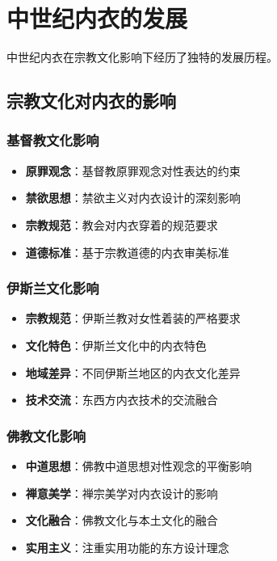 \documentclass[12pt,UTF8]{ctexbook}
\begin{document}
\section{中世纪内衣的发展}
中世纪内衣在宗教文化影响下经历了独特的发展历程。

\subsection{宗教文化对内衣的影响}
\subsubsection{基督教文化影响}
\begin{itemize}[leftmargin=2cm]
	\item \textbf{原罪观念}：基督教原罪观念对性表达的约束
	\item \textbf{禁欲思想}：禁欲主义对内衣设计的深刻影响
	\item \textbf{宗教规范}：教会对内衣穿着的规范要求
	\item \textbf{道德标准}：基于宗教道德的内衣审美标准
\end{itemize}

\subsubsection{伊斯兰文化影响}
\begin{itemize}[leftmargin=2cm]
	\item \textbf{宗教规范}：伊斯兰教对女性着装的严格要求
	\item \textbf{文化特色}：伊斯兰文化中的内衣特色
	\item \textbf{地域差异}：不同伊斯兰地区的内衣文化差异
	\item \textbf{技术交流}：东西方内衣技术的交流融合
\end{itemize}

\subsubsection{佛教文化影响}
\begin{itemize}[leftmargin=2cm]
	\item \textbf{中道思想}：佛教中道思想对性观念的平衡影响
	\item \textbf{禅意美学}：禅宗美学对内衣设计的影响
	\item \textbf{文化融合}：佛教文化与本土文化的融合
	\item \textbf{实用主义}：注重实用功能的东方设计理念
\end{itemize}
\end{document}
